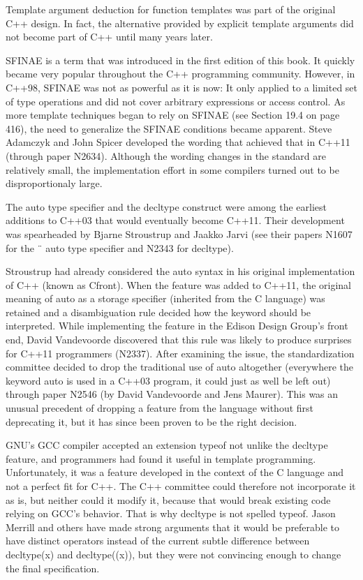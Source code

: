 Template argument deduction for function templates was part of the original C++ design. In fact, the alternative provided by explicit template arguments did not become part of C++ until many years later.

SFINAE is a term that was introduced in the first edition of this book. It quickly became very popular throughout the C++ programming community. However, in C++98, SFINAE was not as powerful as it is now: It only applied to a limited set of type operations and did not cover arbitrary expressions or access control. As more template techniques began to rely on SFINAE (see Section 19.4 on page 416), the need to generalize the SFINAE conditions became apparent. Steve Adamczyk and John Spicer developed the wording that achieved that in C++11 (through paper N2634). Although the wording changes in the standard are relatively small, the implementation effort in some compilers turned out to be disproportionaly large.

The auto type specifier and the decltype construct were among the earliest additions to C++03 that would eventually become C++11. Their development was spearheaded by Bjarne Stroustrup and Jaakko Jarvi (see their papers N1607 for the ¨ auto type specifier and N2343 for decltype).

Stroustrup had already considered the auto syntax in his original implementation of C++ (known as Cfront). When the feature was added to C++11, the original meaning of auto as a storage specifier (inherited from the C language) was retained and a disambiguation rule decided how the keyword should be interpreted. While implementing the feature in the Edison Design Group’s front end, David Vandevoorde discovered that this rule was likely to produce surprises for C++11 programmers (N2337). After examining the issue, the standardization committee decided to drop the traditional use of auto altogether (everywhere the keyword auto is used in a C++03 program, it could just as well be left out) through paper N2546 (by David Vandevoorde and Jens Maurer). This was an unusual precedent of dropping a feature from the language without first deprecating it, but it has since been proven to be the right decision.

GNU’s GCC compiler accepted an extension typeof not unlike the decltype feature, and programmers had found it useful in template programming. Unfortunately, it was a feature developed in the context of the C language and not a perfect fit for C++. The C++ committee could therefore not incorporate it as is, but neither could it modify it, because that would break existing code relying on GCC’s behavior. That is why decltype is not spelled typeof. Jason Merrill and others have made strong arguments that it would be preferable to have distinct operators instead of the current subtle difference between decltype(x) and decltype((x)), but they were not convincing enough to change the final specification.

